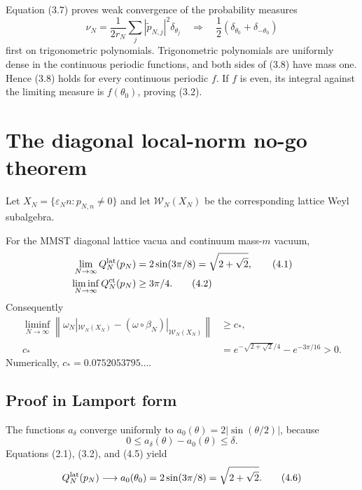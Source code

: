 \documentclass[11pt,a4paper]{article}
\newcommand{\W}{\mathcal W}
\newcommand{\eps}{\varepsilon}
\begin{document}

Equation (3.7) proves weak convergence of the probability measures
\[
 \nu_N=\frac1{2r_N}\sum_j|\widetilde p_{N,j}|^2\delta_{\theta_j}
 \quad\Longrightarrow\quad
 \frac12(\delta_{\theta_0}+\delta_{-\theta_0})                 \tag{3.8}
\]
first on trigonometric polynomials.  Trigonometric polynomials are uniformly dense
in the continuous periodic functions, and both sides of (3.8) have mass one.
Hence (3.8) holds for every continuous periodic $f$.  If $f$ is even, its integral
against the limiting measure is $f(\theta_0)$, proving (3.2). \QedStep

\section{The diagonal local-norm no-go theorem}\label{sec:nogo}

Let $X_N=\{\eps_Nn:p_{N,n}\neq0\}$ and let $\W_N(X_N)$ be the corresponding
lattice Weyl subalgebra.

\begin{theorem}\label{thm:nogo}
For the MMST diagonal lattice vacua and continuum mass-$m$ vacuum,
\begin{align}
 \lim_{N\to\infty}Q_N^{\rm lat}(p_N)
 &=2\sin(3\pi/8)=\sqrt{2+\sqrt2},                               \tag{4.1}\\
 \liminf_{N\to\infty}Q_N^{\rm ct}(p_N)
 &\geq 3\pi/4.                                                   \tag{4.2}
\end{align}
Consequently
\begin{align}
 \liminf_{N\to\infty}
 \left\|
 \omega_N|_{\W_N(X_N)}-(\omega\circ\beta_N)|_{\W_N(X_N)}
 \right\|
 &\geq c_*,                                                       \tag{4.3}\\
 c_*&=e^{-\sqrt{2+\sqrt2}/4}-e^{-3\pi/16}>0.                    \tag{4.4}
\end{align}
Numerically, $c_*=0.0752053795\ldots$.
\end{theorem}

\subsection*{Proof in Lamport form}


The functions $a_\delta$ converge uniformly to
$a_0(\theta)=2|\sin(\theta/2)|$, because
\[
 0\leq a_\delta(\theta)-a_0(\theta)\leq\delta.                  \tag{4.5}
\]
Equations (2.1), (3.2), and (4.5) yield
\[
 Q_N^{\rm lat}(p_N)\longrightarrow a_0(\theta_0)
 =2\sin(3\pi/8)=\sqrt{2+\sqrt2}.                                \tag{4.6}
\]
\end{document}

